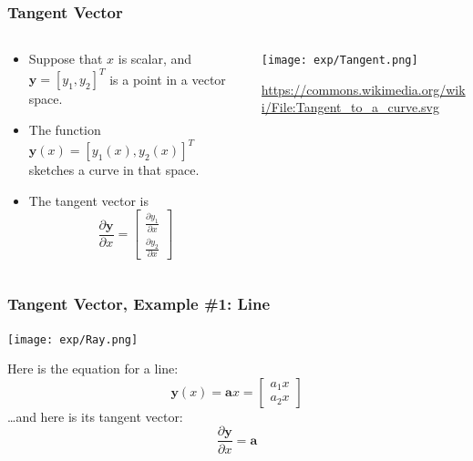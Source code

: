 \documentclass{beamer}
\begin{document}
\begin{frame}
  \frametitle{Tangent Vector}
  \begin{columns}
    \begin{column}{0.5\textwidth}
      \begin{itemize}
      \item 
        Suppose that $x$ is scalar, and $\mathbf{y}=[y_1,y_2]^T$ is a
        point in a vector space.
      \item
        The function $\mathbf{y}(x)=[y_1(x),y_2(x)]^T$ sketches a
        curve in that space.
      \item
        The tangent vector is
        \begin{displaymath}
          \frac{\partial\mathbf{y}}{\partial x}=\left[\begin{array}{c}
              \frac{\partial y_1}{\partial x}\\
              \frac{\partial y_2}{\partial x}
            \end{array}\right]
        \end{displaymath}
      \end{itemize}
    \end{column}
    \begin{column}{0.5\textwidth}
      \centerline{\texttt{[image: exp/Tangent.png]}}
      \url{https://commons.wikimedia.org/wiki/File:Tangent_to_a_curve.svg}
    \end{column}
  \end{columns}
\end{frame}

\begin{frame}
  \frametitle{Tangent Vector, Example \#1: Line}

  \centerline{\texttt{[image: exp/Ray.png]}}
  
  Here is the equation for a line:
  \begin{displaymath}
    \mathbf{y}(x) = \mathbf{a}x = \left[\begin{array}{c}a_1x\\a_2x\end{array}\right]
  \end{displaymath}
  \ldots and here is its tangent vector:
  \begin{displaymath}
    \frac{\partial\mathbf{y}}{\partial x}
    = \mathbf{a}
  \end{displaymath}
\end{frame}
  
\end{document}
